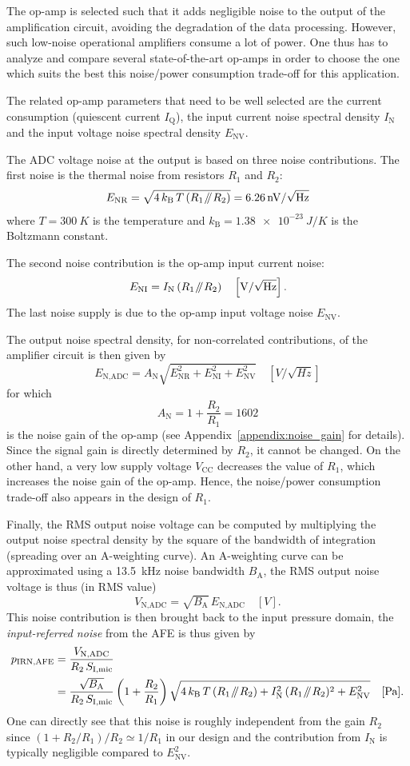 \documentclass{EPL-master-thesis-covers-EN}
\newcommand{\parallelsum}{\mathbin{\!/\mkern-5mu/\!}}
\newcommand{\te}[1]{\textrm{#1}}
\begin{document}
The op-amp is selected such that it adds negligible noise to the output of the amplification circuit, avoiding the degradation of the data processing. However, such low-noise operational amplifiers consume a lot of power. One thus has to analyze and compare several state-of-the-art op-amps in order to choose the one which suits the best this noise/power consumption trade-off for this application.

The related op-amp parameters that need to be well selected are the current consumption (quiescent current $I_\te{Q}$), the input current noise spectral density $I_\te{N}$ and the input voltage noise spectral density $E_\te{NV}$.

The ADC voltage noise at the output is based on three noise contributions. The first noise is the thermal noise from resistors $R_1$ and $R_2$:
\[
 E_\te{NR} = \sqrt{4 \, k_\te{B} \, T \, (R_1 \parallelsum R_2)} = \SI{6.26}{nV/\sqrt{Hz}}
\]
where $T = \SI{300}{K}$ is the temperature and $k_\te{B} = \SI{1.38e-23}{J/K}$ is the Boltzmann constant.

The second noise contribution is the op-amp input current noise:
\[
 E_\te{NI} = I_\te{N} \, (R_1 \parallelsum R_2) \quad \left[\si{V/\sqrt{Hz}}\right].
\]
The last noise supply is due to the op-amp input voltage noise $E_\te{NV}$.

The output noise spectral density, for non-correlated contributions, of the amplifier circuit is then given by
\[
 E_\te{N,ADC} = A_\te{N} \sqrt{E_\te{NR}^2 + E_\te{NI}^2 + E_\te{NV}^2} \quad \left[\si{V/\sqrt{Hz}}\right]
\]
for which
\[
 A_\te{N} = 1 + \frac{R_2}{R_1} = 1602
\]
is the noise gain of the op-amp (see Appendix~\ref{appendix:noise_gain} for details). Since the signal gain is directly determined by $R_2$, it cannot be changed. On the other hand, a very low supply voltage $V_\te{CC}$ decreases the value of $R_1$, which increases the noise gain of the op-amp. Hence, the noise/power consumption trade-off also appears in the design of $R_1$.

Finally, the RMS output noise voltage can be computed by multiplying the output noise spectral density by the square of the bandwidth of integration (spreading over an A-weighting curve). An A-weighting curve can be approximated using a \SI{13.5}{kHz} noise bandwidth $B_\te{A}$, the RMS output noise voltage is thus (in RMS value)
\[
 V_\te{N,ADC} = \sqrt{B_\te{A}} \, E_\te{N,ADC} \quad [\si{V}].
\]
This noise contribution is then brought back to the input pressure domain, the \textit{input-referred noise} from the AFE is thus given by
\begin{align*}
  p_\te{IRN,AFE} &= \frac{V_\te{N,ADC}}{R_2\,S_{\te{I,mic}}}\\
   &= \frac{\sqrt{B_\te{A}}}{R_2\,S_{\te{I,mic}}} \left(1 + \frac{R_2}{R_1}\right) \sqrt{4 \, k_\te{B} \, T \, (R_1 \parallelsum R_2) + I_\te{N}^2 \, (R_1 \parallelsum R_2)^2 + E_\te{NV}^2} \quad \si{[Pa]}.
\end{align*}
One can directly see that this noise is roughly independent from the gain $R_2$ since $(1+R_2/R_1)/R_2\simeq 1/R_1$ in our design and the contribution from $I_\te{N}$ is typically negligible compared to $E_\te{NV}^2$.
\end{document}
